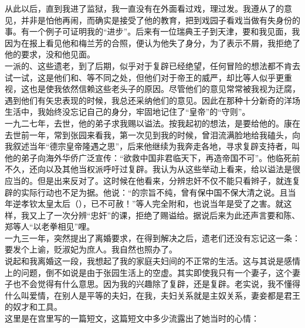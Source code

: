 从此以后，直到我进了监狱，我一直没有在外面看过戏，理过发。我遵从了的意见，并非是怕他再闹，而确实是接受了他的教育，把到戏园子看戏当做有失身份的事。有一个例子可证明我的“进步”。后来有一位瑞典王子到天津，要和我见面，我因为在报上看见他和梅兰芳的合照，便认为他失了身分，为了表示不屑，我拒绝了他的要求，没和他见面。\\

一派的、这些遗老，到了后期，似乎对于复辟已经绝望，任何冒险的想法都不肯去试一试，这是他们和、等不同之处，但他们对于帝王的威严，却比等人似乎更重视，这也是使我依然信赖这些老头子的原因。尽管他们的意见常常被我视为迂腐，遇到他们有矢忠表现的时候，我总还采纳他们的意见。因此在那种十分新奇的洋场生活中，我始终没忘记自己的身分，牢固地记住了“皇帝”的“守则”。\\

一九二七年，去世，他的弟子求我赐以谥法。按我起初的想法，是要给他的。康在去世前一年，常到张园来看我，第一次见到我的时候，曾泪流满脸地给我磕头，向我叙述当年“德宗皇帝隆遇之思”，后来他继续为我奔走各地，寻求复辟支持者，叫他的弟子向海外华侨广泛宣传：“欲救中国非君临天下，再造帝国不可”。他临死前不久，还向以及其他当权派呼吁过复辟。我认为从这些举动上看来，给以谥法是很应当的。但是出来反对了。这时候在他看来，分辨忠奸不仅不能只看辫子，就连复辟的实际行动也不足为据。他说：“的宗旨不纯，曾有保中国不保大清之说。且当年逆孝钦太皇太后（），已不可赦！”等人完全附和，也说当年是受了之害。就这样，我又上了一次分辨“忠奸”的课，拒绝了赐谥给。据说后来为此还声言要和陈、郑等人“以老拳相见”哩。\\

一九三一年，突然提出了离婚要求，在得到解决之后，遗老们还没有忘记这一条：要发个上谕，贬淑妃为庶人。我自然也照办了。\\

说起和我离婚这一段，我想起了我的家庭夫妇间的不正常的生活。这与其说是感情上的问题，倒不如说是由于张园生活上的空虚。其实即使我只有一个妻子，这个妻子也不会觉得有什么意思。因为我的兴趣除了复辟，还是复辟。老实说，我不懂得什么叫爱情，在别人是平等的夫妇，在我，夫妇关系就是主奴关系，妻妾都是君王的奴才和工具。\\

这里是在宫里写的一篇短文，这篇短文中多少流露出了她当时的心情：\\


